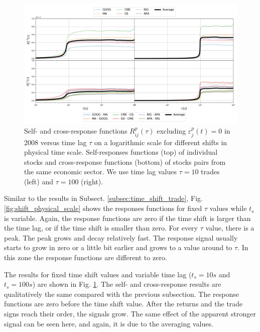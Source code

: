 \begin{figure}[htbp]
    \centering
    \includegraphics[width=\textwidth]{figures/04_shift_responses_physical.png}
    \caption{Self- and cross-response functions $R^{p}_{ij}\left(\tau\right)$
             excluding $\varepsilon^{p}_{j}\left(t\right) = 0$ in 2008 versus
             time lag $\tau$ on a logarithmic scale for different shifts in
             physical time scale. Self-responses functions (top) of individual
             stocks and cross-response functions (bottom) of stocks pairs from
             the same economic sector. We use time lag values $\tau=10$ trades
             (left) and $\tau=100$ (right).}
    \label{fig:shift_responses_physical_scale}
\end{figure}

Similar to the results in Subsect. \ref{subsec:time_shift_trade}, Fig.
\ref{fig:shift_physical_scale} shows the responses functions for fixed $\tau$
values while $t_{s}$ is variable. Again, the response functions are zero if the
time shift is larger than the time lag, or if the time shift is smaller than
zero. For every $\tau$ value, there is a peak. The peak grows and decay
relatively fast. The response signal usually starts to grow in zero or a little
bit earlier and grows to a value around to $\tau$. In this zone the response
functions are different to zero.

The results for fixed time shift values and variable time lag ($t_{s}=10s$ and
$t_{s}=100s$) are shown in Fig. \ref{fig:shift_responses_physical_scale}. The
self- and cross-response results are qualitatively the same compared with the
previous subsection. The response functions are zero before the time shift
value. After the returns and the trade signs reach their order, the signals
grow. The same effect of the apparent stronger signal can be seen here, and
again, it is due to the averaging values.

